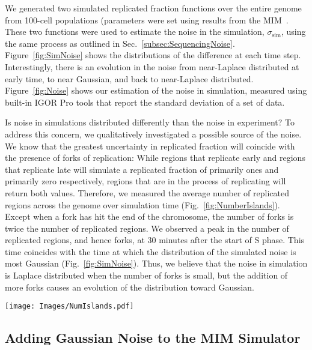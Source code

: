 		We generated two simulated replicated fraction functions over the entire genome from 100-cell populations (parameters were set using results from the MIM~\cite{ScottsPaper}.
		These two functions were used to estimate the noise in the simulation, $\sigma_\text{sim}$, using the same process as outlined in Sec.~\ref{subsec:SequencingNoise}.
		Figure~\ref{fig:SimNoise} shows the distributions of the difference at each time step.
		Interestingly, there is an evolution in the noise from near-Laplace distributed at early time, to near Gaussian, and back to near-Laplace distributed.
		Figure~\ref{fig:Noise} shows our estimation of the noise in simulation, measured using built-in IGOR Pro tools that report the standard deviation of a set of data.
		
		Is  noise in simulations distributed differently than the noise in experiment?
		To address this concern, we qualitatively investigated a possible source of the noise.
		We know that the greatest uncertainty in replicated fraction will coincide with the presence of forks of replication:
		While regions that replicate early and regions that replicate late will simulate a replicated fraction of primarily ones and primarily zero respectively, regions that are in the process of replicating will return both values.
		Therefore, we measured  the average number of replicated regions across the genome over simulation time (Fig.~\ref{fig:NumberIslands}).
		Except when a fork has hit the end of the chromosome, the number of forks is twice the number of replicated regions.
		We observed a peak in the number of replicated regions, and hence forks, at 30 minutes after the start of S phase.
		This time coincides with the time at which the distribution of the simulated noise is most Gaussian (Fig.~\ref{fig:SimNoise}).
		Thus, we believe that the noise in simulation is Laplace distributed when the number of forks is small, but the addition of more forks causes an evolution of the distribution toward Gaussian.
		
		\begin{SCfigure}[1][tbh]
			\texttt{[image: Images/NumIslands.pdf]}
			\caption[Number of Replicated Regions in Simulation]{\label{fig:NumberIslands}
				Histogram of the number of replicated region in the simulation, normalized to a single cell.
				x-axis shows $t_\text{sim}$ in minutes.
			}
		\end{SCfigure}
		
		
		\subsection{Adding Gaussian Noise to the MIM Simulator}
		\label{subsec:AddingNoise}
		
